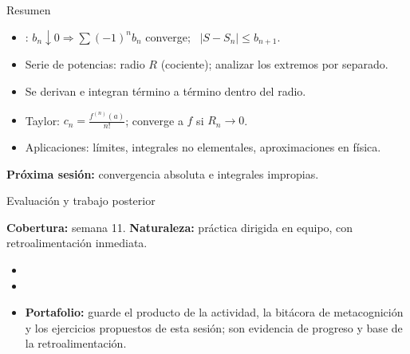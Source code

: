 \documentclass[10pt,aspectratio=169]{beamer}
\begin{document}
\begin{frame}{Resumen}
  \begin{itemize}
    \item {}: $b_n\downarrow0\Rightarrow\sum(-1)^nb_n$ converge; \ $|S-S_n|\le b_{n+1}$.
    \item Serie de potencias: radio $R$ (cociente); analizar los extremos por separado.
    \item Se derivan e integran término a término dentro del radio.
    \item Taylor: $c_n=\frac{f^{(n)}(a)}{n!}$; converge a $f$ si $R_n\to0$.
    \item Aplicaciones: límites, integrales no elementales, aproximaciones en física.
  \end{itemize}
  \vspace{3mm}
  \textbf{Próxima sesión:} convergencia absoluta e integrales impropias.
\end{frame}


\begin{frame}{Evaluación y trabajo posterior}
  \small
  \begin{evalbox}
    \textbf{Cobertura:} semana 11. \textbf{Naturaleza:} práctica dirigida en equipo, con retroalimentación inmediata.
  \end{evalbox}
  \begin{itemize}
    \item \criterios
    \item \declaracionia
    \item \textbf{Portafolio:} guarde el producto de la actividad, la bitácora de metacognición y los ejercicios propuestos de esta sesión; son evidencia de progreso y base de la retroalimentación.
  \end{itemize}
\end{frame}
\end{document}
